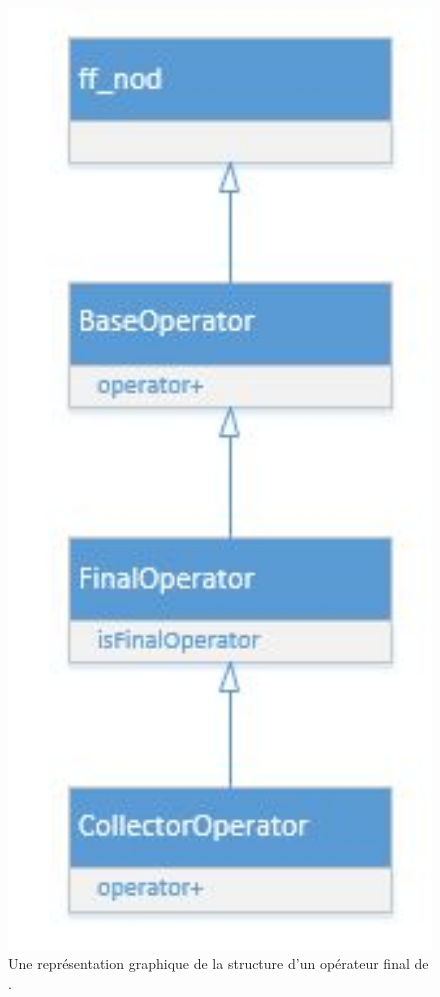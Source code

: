 \begin{figure}
\centering
     \includegraphics[width=1.0\textwidth]{Figures/StructureCollectorOperator.jpg}
      \caption{Une repr\'esentation graphique de la structure d'un op\'erateur final de .}
       \label{InheritanceCollectorOperator.fig}
\end{figure}


